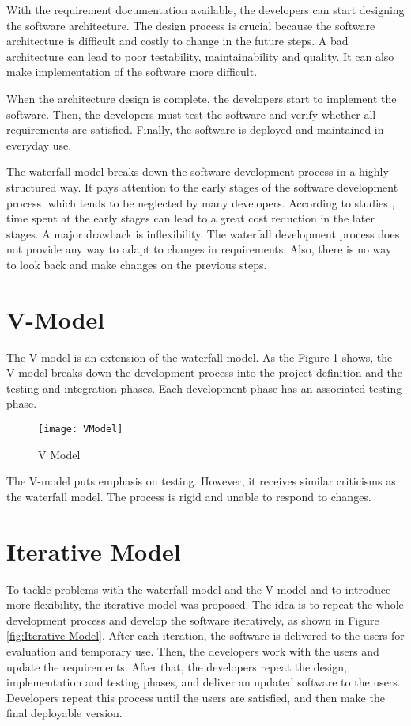 With the requirement documentation available, the developers can start designing the software architecture. The design process is crucial because the software architecture is difficult and costly to change in the future steps. A bad architecture can lead to poor testability, maintainability and quality. It can also make implementation of the software more difficult.

When the architecture design is complete, the developers start to implement the software. Then, the developers must test the software and verify whether all requirements are satisfied. Finally, the software is deployed and maintained in everyday use.

The waterfall model breaks down the software development process in a highly structured way. It pays attention to the early stages of the software development process, which tends to be neglected by many developers. According to studies \cite{mcconnell1996rapid}, time spent at the early stages can lead to a great cost reduction in the later stages. A major drawback is inflexibility. The waterfall development process does not provide any way to adapt to changes in requirements. Also, there is no way to look back and make changes on the previous steps.

\section{V-Model}
The V-model is an extension of the waterfall model. As the Figure \ref{fig:V Model} shows, the V-model breaks down the development process into the project definition and the testing and integration phases. Each development phase has an associated testing phase.

\begin{figure}[htb]
\centering
\texttt{[image: VModel]}
\caption{V Model\label{fig:V Model}}
\end{figure}

The V-model puts emphasis on testing. However, it receives similar criticisms as the waterfall model. The process is rigid and unable to respond to changes.

\section{Iterative Model}
To tackle problems with the waterfall model and the V-model and to introduce more flexibility, the iterative model was proposed. The idea is to repeat the whole development process and develop the software iteratively, as shown in Figure \ref{fig:Iterative Model}. After each iteration, the software is delivered to the users for evaluation and temporary use. Then, the developers work with the users and update the requirements. After that, the developers repeat the design, implementation and testing phases, and deliver an updated software to the users. Developers repeat this process until the users are satisfied, and then make the final deployable version.

